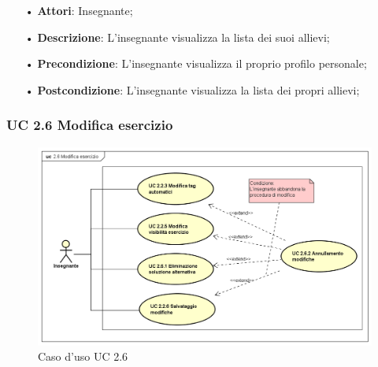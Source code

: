 \begin{itemize}
	\item[•] \textbf{Attori}: Insegnante;
	\item[•] \textbf{Descrizione}: L’insegnante visualizza la lista dei suoi allievi;
	\item[•] \textbf{Precondizione}: L'insegnante visualizza il proprio profilo personale;
	\item[•] \textbf{Postcondizione}: L’insegnante visualizza la lista dei propri allievi;
\end{itemize}



\subsubsection{UC 2.6 Modifica esercizio}
\begin{figure}[H]
\centering
\includegraphics[width=17cm]{img/UC26.png} 
\caption{Caso d'uso UC 2.6}
\end{figure}

